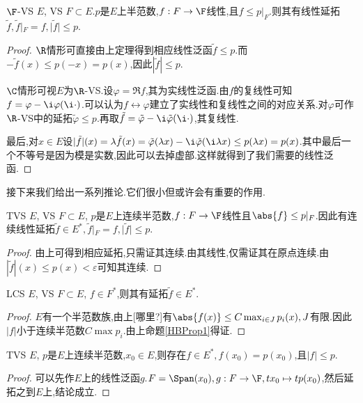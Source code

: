 \documentclass{article}
\begin{document}
\begin{theorem}\label{HBThm2}
    $\F$-VS $E$, VS $F\subset E$.$p$是$E$上半范数,$f:F\to \F$线性,且$f\leq p|_F$.则其有线性延拓$\tilde{f}, \tilde{f}|_F=f, |\tilde{f}|\leq p$.
\end{theorem}
\begin{proof}
    $\R$情形可直接由上定理得到相应线性泛函$\tilde{f}\leq p$.而$-\tilde{f}(x)\leq p(-x)=p(x)$,因此$|\tilde{f}|\leq p$.

    $\C$情形可视$E$为$\R$-VS.设$\varphi=\Re f$,其为实线性泛函.由$f$的复线性可知$f=\varphi-\i \varphi(\i \cdot)$.可以认为$f\leftrightarrow \varphi$建立了实线性和复线性之间的对应关系.对$\varphi$可作$\R$-VS中的延拓$\tilde{\varphi}\leq p$.再取$\tilde{f}=\tilde{\varphi}-\i \tilde{\varphi}(\i \cdot)$,其复线性.

    最后,对$x\in E$设$|\tilde{f}|(x)=\lambda \tilde{f}(x)=\tilde{\varphi}(\lambda x)-\i \tilde{\varphi}(\i \lambda x)\leq p(\lambda x)=p(x)$.其中最后一个不等号是因为模是实数,因此可以去掉虚部.这样就得到了我们需要的线性泛函.
\end{proof}

接下来我们给出一系列推论.它们很小但或许会有重要的作用.
\begin{proposition}\label{HBProp1}
    TVS $E$, VS $F\subset E$, $p$是$E$上连续半范数,$f:F\to \F$线性且$\abs{f}\leq p|_F$.因此有连续线性延拓$\tilde{f}\in E^*, \tilde{f}|_F=f, |\tilde{f}|\leq p$.
\end{proposition}
\begin{proof}
    由上可得到相应延拓,只需证其连续.由其线性,仅需证其在原点连续.由$|\tilde{f}|(x)\leq p(x)<\varepsilon$可知其连续.
\end{proof}

\begin{proposition}
    LCS $E$, VS $F\subset E$, $f\in F^*$,则其有延拓$\tilde{f}\in E^*$.
\end{proposition}
\begin{proof}
    $E$有一个半范数族,由上[哪里?]有$\abs{f(x)}\leq C \max_{i\in J} p_i(x), J$有限.因此$|f|$小于连续半范数$C \max p_i$.由上命题\ref{HBProp1}得证.
\end{proof}

\begin{proposition}
    TVS $E$, $p$是$E$上连续半范数,$x_0\in E$,则存在$f\in E^*,f(x_0)=p(x_0)$,且$|f|\leq p$.
\end{proposition}
\begin{proof}
    可以先作$E$上的线性泛函$g$.$F=\Span(x_0), g:F\to \F, tx_0\mapsto tp(x_0)$,然后延拓之到$E$上,结论成立.
\end{proof}
\end{document}
